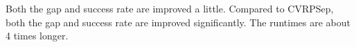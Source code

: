 \documentclass[11pt]{article}
\begin{document}
\begin{spacing}{1.5}
\begin{table}[!htb]
\caption{Runtime for the best result of SA}
\end{table}
Both the gap and success rate are improved a little. Compared to CVRPSep, both the gap and success rate are improved significantly. The runtimes are about 4 times longer.


\end{spacing}
\end{document}
